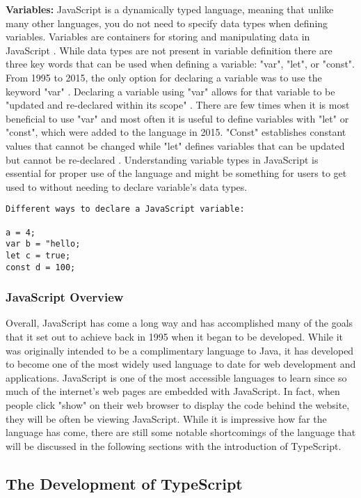 \documentclass{article}
\theoremstyle{theorem}
\theoremstyle{definition}
\theoremstyle{remark}
\begin{document}
\textbf{Variables:}
JavaScript is a dynamically typed language, meaning that unlike many other languages, you do not need to specify data types when defining variables. Variables are containers for storing and manipulating data in JavaScript \cite{8}. While data types are not present in variable definition there are three key words that can be used when defining a variable: "var", "let", or "const". From 1995 to 2015, the only option for declaring a variable was to use the keyword "var" \cite{8}. Declaring a variable using "var" allows for that variable to be "updated and re-declared within its scope" \cite{9}. There are few times when it is most beneficial to use "var" and most often it is useful to define variables with "let" or "const", which were added to the language in 2015. "Const" establishes constant values that cannot be changed while "let" defines variables that can be updated but cannot be re-declared \cite{9}. Understanding variable types in JavaScript is essential for proper use of the language and might be something for users to get used to without needing to declare variable's data types.

\begin{lstlisting}
Different ways to declare a JavaScript variable:

a = 4;
var b = "hello;
let c = true;
const d = 100;
\end{lstlisting}

\subsubsection{JavaScript Overview}
Overall, JavaScript has come a long way and has accomplished many of the goals that it set out to achieve back in 1995 when it began to be developed. While it was originally intended to be a complimentary language to Java, it has developed to become one of the most widely used language to date for web development and applications. JavaScript is one of the most accessible languages to learn since so much of the internet’s web pages are embedded with JavaScript. In fact, when people click "show" on their web browser to display the code behind the website, they will be often be viewing JavaScript. While it is impressive how far the language has come, there are still some notable shortcomings of the language that will be discussed in the following sections with the introduction of TypeScript.

\subsection{The Development of TypeScript}
\end{document}
